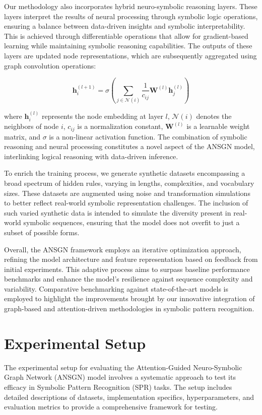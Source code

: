 \documentclass{article}
\begin{document}
Our methodology also incorporates hybrid neuro-symbolic reasoning layers. These layers interpret the results of neural processing through symbolic logic operations, ensuring a balance between data-driven insights and symbolic interpretability. This is achieved through differentiable operations that allow for gradient-based learning while maintaining symbolic reasoning capabilities. The outputs of these layers are updated node representations, which are subsequently aggregated using graph convolution operations:


\[
\mathbf{h}_i^{(l+1)} = \sigma \left( \sum_{j \in \mathcal{N}(i)} \frac{1}{c_{ij}} \mathbf{W}^{(l)} \mathbf{h}_j^{(l)} \right)
\]

where \(\mathbf{h}_i^{(l)}\) represents the node embedding at layer \(l\), \(\mathcal{N}(i)\) denotes the neighbors of node \(i\), \(c_{ij}\) is a normalization constant, \(\mathbf{W}^{(l)}\) is a learnable weight matrix, and \(\sigma\) is a non-linear activation function. The combination of symbolic reasoning and neural processing constitutes a novel aspect of the ANSGN model, interlinking logical reasoning with data-driven inference.

To enrich the training process, we generate synthetic datasets encompassing a broad spectrum of hidden rules, varying in lengths, complexities, and vocabulary sizes. These datasets are augmented using noise and transformation simulations to better reflect real-world symbolic representation challenges. The inclusion of such varied synthetic data is intended to simulate the diversity present in real-world symbolic sequences, ensuring that the model does not overfit to just a subset of possible forms.

Overall, the ANSGN framework employs an iterative optimization approach, refining the model architecture and feature representation based on feedback from initial experiments. This adaptive process aims to surpass baseline performance benchmarks and enhance the model's resilience against sequence complexity and variability. Comparative benchmarking against state-of-the-art models is employed to highlight the improvements brought by our innovative integration of graph-based and attention-driven methodologies in symbolic pattern recognition.

\section{Experimental Setup}
The experimental setup for evaluating the Attention-Guided Neuro-Symbolic Graph Network (ANSGN) model involves a systematic approach to test its efficacy in Symbolic Pattern Recognition (SPR) tasks. The setup includes detailed descriptions of datasets, implementation specifics, hyperparameters, and evaluation metrics to provide a comprehensive framework for testing.
\end{document}
